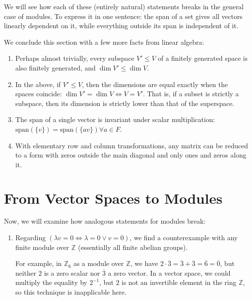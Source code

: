 \documentclass{article}
\newif\ifusemulticols
\theoremstyle{definition}
\theoremstyle{remark}
\theoremstyle{plain}
\theoremstyle{plain}
\newenvironment{mymulticols}
    { \ifusemulticols \begin{multicols}{2} \fi }
    { \ifusemulticols \end{multicols} \fi }
\newcommand{\Z}{\mathbb{Z}}
\begin{document}
\begin{mymulticols}
We will see how each of these (entirely natural) statements breaks in the general case of modules.
To express it in one sentence: the span of a set gives all vectors linearly dependent on it, while
everything outside its span is independent of it.

We conclude this section with a few more facts from linear algebra:
\begin{enumerate}
    \item Perhaps almost trivially, every subspace $V' \le V$ of a finitely generated space is also
        finitely generated, and $\dim V' \le \dim V$.

    \item In the above, if $V' \le V$, then the dimensions are equal exactly when the spaces
        coincide: $\dim V' = \dim V \Leftrightarrow V = V'$. That is, if a subset is strictly a
        subspace, then its dimension is strictly lower than that of the superspace.

    \item The span of a single vector is invariant under scalar multiplication: $\text{span}(\{v\})
        = \text{span}(\{av\}) \forall a \in F$.

    \item With elementary row and column transformations, any matrix can be reduced to a form with
        zeros outside the main diagonal and only ones and zeros along it.
\end{enumerate}

\section{From Vector Spaces to Modules}

Now, we will examine how analogous statements for modules break:
\begin{enumerate}
    \item Regarding $(\lambda v = 0 \Leftrightarrow \lambda = 0 \lor v = 0)$, we find a
        counterexample with any finite module over $\Z$ (essentially all finite abelian groups).

        For example, in $\Z_6$ as a module over $\Z$, we have $2 \cdot \overline{3} = \overline{3} +
        \overline{3} = \overline{6} = \overline{0}$, but neither $2$ is a zero scalar nor
        $\overline{3}$ a zero vector.
        In a vector space, we could multiply the equality by $2^{-1}$, but $2$ is not an invertible
        element in the ring $\Z$, so this technique is inapplicable here.


\end{enumerate}
\end{mymulticols}
\end{document}
